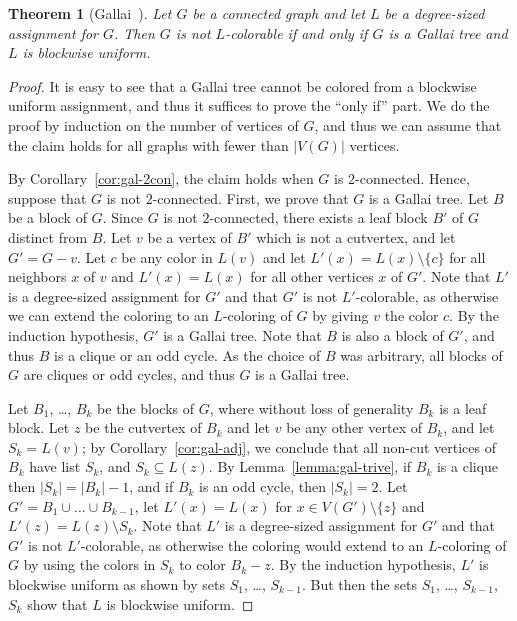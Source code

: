 \documentclass[12pt,twoside,openright,a4paper]{book}
\newtheorem{theorem}{Theorem}[chapter]
\begin{document}
\begin{theorem}[Gallai~\cite{galfor}]\label{thm:gallai}
Let $G$ be a connected graph and let $L$ be a degree-sized assignment for $G$. Then $G$ is not $L$-colorable if and only if
$G$ is a Gallai tree and $L$ is blockwise uniform.
\end{theorem}
\begin{proof}
It is easy to see that a Gallai tree cannot be colored from a blockwise uniform assignment, and thus it suffices to prove
the ``only if'' part.  We do the proof by induction on the number of vertices of $G$, and thus we can assume that the
claim holds for all graphs with fewer than $|V(G)|$ vertices.

By Corollary~\ref{cor:gal-2con}, the claim holds when $G$ is $2$-connected.  Hence, suppose that $G$ is not $2$-connected.
First, we prove that $G$ is a Gallai tree.  Let $B$ be a block of $G$.  Since $G$ is not $2$-connected, there exists a leaf block $B'$ of $G$
distinct from $B$.  Let $v$ be a vertex of $B'$ which is not a cutvertex, and let $G'=G-v$.  Let $c$ be any color in $L(v)$
and let $L'(x)=L(x)\setminus\{c\}$ for all neighbors $x$ of $v$ and $L'(x)=L(x)$ for all other vertices $x$ of $G'$.  Note that $L'$
is a degree-sized assignment for $G'$ and that $G'$ is not $L'$-colorable, as otherwise we can extend the coloring to an $L$-coloring of $G$ by giving $v$ the color $c$.
By the induction hypothesis, $G'$ is a Gallai tree.  Note that $B$ is also a block of $G'$, and thus $B$ is a clique or an odd cycle.
As the choice of $B$ was arbitrary, all blocks of $G$ are cliques or odd cycles, and thus $G$ is a Gallai tree.

Let $B_1$, \ldots, $B_k$ be the blocks of $G$, where without loss of generality $B_k$ is a leaf block.
Let $z$ be the cutvertex of $B_k$ and let $v$ be any other vertex of $B_k$, and let $S_k=L(v)$; by Corollary~\ref{cor:gal-adj}, we conclude that
all non-cut vertices of $B_k$ have list $S_k$, and $S_k\subseteq L(z)$.  By Lemma~\ref{lemma:gal-trive}, if $B_k$ is a clique then $|S_k|=|B_k|-1$, and if $B_k$ is an odd cycle, then $|S_k|=2$.
Let $G'=B_1\cup\ldots\cup B_{k-1}$, let $L'(x)=L(x)$ for $x\in V(G')\setminus \{z\}$ and $L'(z)=L(z)\setminus S_k$.  Note that $L'$ is a degree-sized assignment
for $G'$ and that $G'$ is not $L'$-colorable, as otherwise the coloring would extend to an $L$-coloring of $G$ by using the colors in $S_k$ to color $B_k-z$.
By the induction hypothesis, $L'$ is blockwise uniform as shown by sets $S_1$, \ldots, $S_{k-1}$.  But then the sets $S_1$, \ldots, $S_{k-1}$, $S_k$ show
that $L$ is blockwise uniform.
\end{proof}
\end{document}
